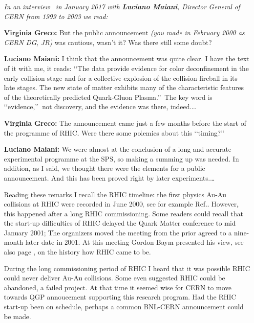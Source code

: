 \noindent \textit{In an interview~\cite{MaianiInterview} in January 2017 with \textbf{Luciano Maiani}, Director General of CERN from 1999 to 2003 we read:}\\[-0.7cm]
%
\begin{mdframed}[linecolor=gray,roundcorner=12pt,backgroundcolor=GreenYellow!15,linewidth=1pt,leftmargin=0cm,rightmargin=0cm,topline=true,bottomline=true,skipabove=12pt]\relax%
%
\vskip 0.0cm
\hspace*{0.4cm} \textbf{Virginia Greco:} But the public announcement \textit{(you made in February 2000 as CERN DG, JR)\/} was cautious, wasn\rq t it? Was there still some doubt?

\textbf{Luciano Maiani:} I think that the announcement was quite clear. I have the text of it with me, it reads: \lq\lq The data provide evidence for color deconfinement in the early collision stage and for a collective explosion of the collision fireball in its late stages. The new state of matter exhibits many of the characteristic features of the theoretically predicted Quark-Gluon Plasma.\rq\rq\ The key word is \lq\lq evidence,\rq\rq\ not discovery, and the evidence was there, indeed.\ldots

\textbf{Virginia Greco:} The announcement came just a few months before the start of the programme of RHIC. Were there some polemics about this \lq\lq timing?\rq\rq\

\textbf{Luciano Maiani:} We were almost at the conclusion of a long and accurate experimental programme at the SPS, so making a summing up was needed. In addition, as I said, we thought there were the elements for a public announcement. And this has been proved right by later experiments.\ldots
%
\end{mdframed}

Reading these remarks I recall the RHIC timeline: the first physics Au-Au collisions at RHIC were recorded in June 2000, see for example Ref.\cite{Back:2000gw}. However, this happened after a long RHIC commissioning. Some readers could recall that the start-up difficulties of RHIC delayed the Quark Matter conference to mid January 2001; The organizers moved the meeting from the prior agreed to a nine-month later date in 2001. At this meeting Gordon Baym presented his view, see also page \pageref{BearMountain}, on the history how RHIC came to be.

During the long commissioning period of RHIC I heard that it was possible RHIC could never deliver Au-Au collisions. Some even suggested RHIC could be abandoned, a failed project. At that time it seemed wise for CERN to move towards QGP annoucement supporting this research program. Had the RHIC start-up been on schedule, perhaps a common BNL-CERN announcement could be made. 

